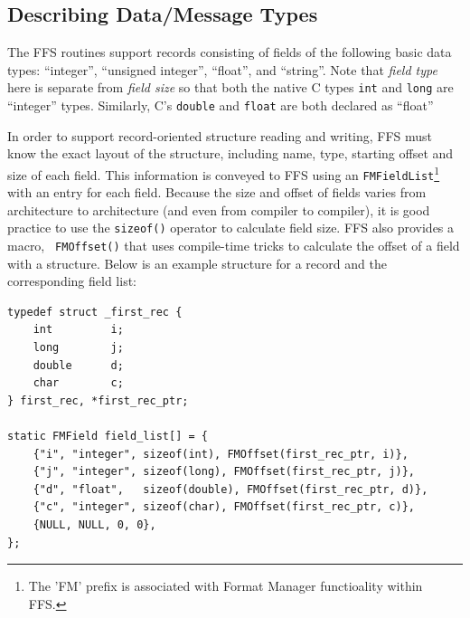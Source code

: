 \subsection{Describing Data/Message Types\label{sec:datatypes}}

The FFS routines support records consisting of fields of the following
basic data types: ``integer'', ``unsigned integer'', ``float'', and
``string''.  Note that {\em field type} here is separate from {\em field
  size} so that both the native C types {\tt int} and {\tt long} are 
``integer'' types.   Similarly, C's {\tt double} and {\tt float} are both
declared as ``float''

In order to support record-oriented structure reading and writing, FFS must
know the exact layout of the structure, including name, type, starting
offset and size of each field.  This information is conveyed to FFS using an
{\tt FMFieldList}\footnote{The 'FM' prefix is associated with Format Manager
  functioality within FFS.}  with an entry for each field.  Because the size
and offset of fields varies from architecture to architecture (and even from
compiler to compiler), it is good practice to use the {\tt sizeof()}
operator to calculate field size.  FFS also provides a macro, {\tt
  FMOffset()} that uses compile-time tricks to calculate the offset of a
field with a structure.  Below is an example structure for a record and the
corresponding field list:
\begin{verbatim}
typedef struct _first_rec {
    int         i;
    long        j;
    double      d;
    char        c;
} first_rec, *first_rec_ptr;

static FMField field_list[] = {
    {"i", "integer", sizeof(int), FMOffset(first_rec_ptr, i)},
    {"j", "integer", sizeof(long), FMOffset(first_rec_ptr, j)},
    {"d", "float",   sizeof(double), FMOffset(first_rec_ptr, d)},
    {"c", "integer", sizeof(char), FMOffset(first_rec_ptr, c)},
    {NULL, NULL, 0, 0},
};
\end{verbatim}

